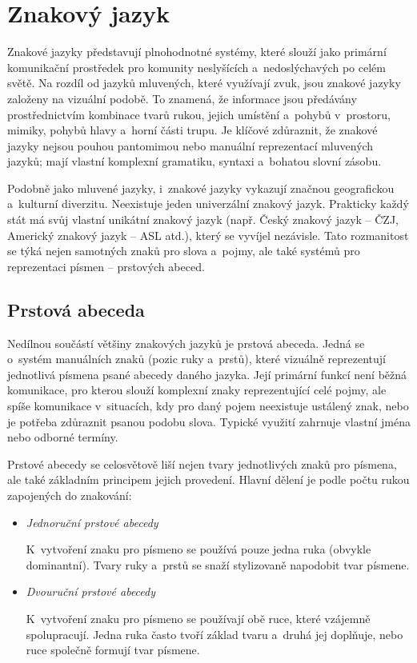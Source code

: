 \documentclass[
  master,
  program=ainfvs,
  biblatex,
  figures=true,
  tables=false,
  sourcecodes=true,
  glossaries,
  index
]{kidiplom}
\begin{document}
\clearpage

\section{Znakový jazyk}
    Znakové jazyky představují plnohodnotné systémy, které slouží jako primární komunikační prostředek pro komunity neslyšících a~nedoslýchavých po celém světě. Na rozdíl od jazyků mluvených, které využívají zvuk, jsou znakové jazyky založeny na vizuální podobě. To znamená, že informace jsou předávány prostřednictvím kombinace tvarů rukou, jejich umístění a~pohybů v~prostoru, mimiky, pohybů hlavy a~horní části trupu. Je klíčové zdůraznit, že znakové jazyky nejsou pouhou pantomimou nebo manuální reprezentací mluvených jazyků; mají vlastní komplexní gramatiku, syntaxi a~bohatou slovní zásobu.


    Podobně jako mluvené jazyky, i~znakové jazyky vykazují značnou geografickou a~kulturní diverzitu. Neexistuje jeden univerzální znakový jazyk. Prakticky každý stát má svůj vlastní unikátní znakový jazyk (např. Český znakový jazyk – ČZJ, Americký znakový jazyk – ASL atd.), který se vyvíjel nezávisle. Tato rozmanitost se týká nejen samotných znaků pro slova a~pojmy, ale také systémů pro reprezentaci písmen – prstových abeced. \cite{ruce.cz}

\subsection{Prstová abeceda}

    Nedílnou součástí většiny znakových jazyků je prstová abeceda. Jedná se o~systém manuálních znaků (pozic ruky a~prstů), které vizuálně reprezentují jednotlivá písmena psané abecedy daného jazyka. Její primární funkcí není běžná komunikace, pro kterou slouží komplexní znaky reprezentující celé pojmy, ale spíše komunikace v~situacích, kdy pro daný pojem neexistuje ustálený znak, nebo je potřeba zdůraznit psanou podobu slova. Typické využití zahrnuje vlastní jména nebo odborné termíny.

    Prstové abecedy se celosvětově liší nejen tvary jednotlivých znaků pro písmena, ale také základním principem jejich provedení. Hlavní dělení je podle počtu rukou zapojených do znakování:

    \begin{itemize}
        \item \emph{Jednoruční prstové abecedy} \par
            K~vytvoření znaku pro písmeno se používá pouze jedna ruka (obvykle dominantní). Tvary ruky a~prstů se snaží stylizovaně napodobit tvar písmene.
        \item \emph{Dvouruční prstové abecedy} \par
            K~vytvoření znaku pro písmeno se používají obě ruce, které vzájemně spolupracují. Jedna ruka často tvoří základ tvaru a~druhá jej doplňuje, nebo ruce společně formují tvar písmene.
    \end{itemize}
    
\end{document}
